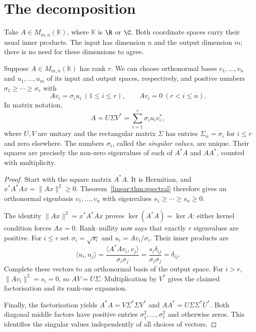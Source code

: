 \section{The decomposition}

Take $A\in M_{m,n}(\mathbb K)$, where $\mathbb K$ is $\R$ or $\C$. Both coordinate spaces carry their usual inner products. The input has dimension $n$ and the output dimension $m$; there is no need for these dimensions to agree.

\begin{theorem}\label{linear:thm:svd}
Suppose $A\in M_{m,n}(\mathbb K)$ has rank $r$. We can choose orthonormal bases $v_1,\ldots,v_n$ and $u_1,\ldots,u_m$ of its input and output spaces, respectively, and positive numbers $\sigma_1\ge\cdots\ge\sigma_r$ with
\[
Av_i=\sigma_iu_i\ (1\le i\le r),\qquad Av_i=0\ (r<i\le n).
\]
In matrix notation,
\[
A=U\Sigma V^*=\sum_{i=1}^r\sigma_iu_iv_i^*,
\]
where $U,V$ are unitary and the rectangular matrix $\Sigma$ has entries $\Sigma_{ii}=\sigma_i$ for $i\le r$ and zero elsewhere. The numbers $\sigma_i$, called the \emph{singular values}, are unique. Their squares are precisely the non-zero eigenvalues of each of $A^*A$ and $AA^*$, counted with multiplicity.
\end{theorem}
\begin{proof}
Start with the square matrix $A^*A$. It is Hermitian, and $x^*A^*Ax=\|Ax\|^2\ge0$. Theorem~\ref{linear:thm:spectral} therefore gives an orthonormal eigenbasis $v_1,\ldots,v_n$ with eigenvalues $s_1\ge\cdots\ge s_n\ge0$.

The identity $\|Ax\|^2=x^*A^*Ax$ proves $\ker(A^*A)=\ker A$: either kernel condition forces $Ax=0$. Rank--nullity now says that exactly $r$ eigenvalues are positive. For $i\le r$ set $\sigma_i=\sqrt{s_i}$ and $u_i=Av_i/\sigma_i$. Their inner products are
\[
\langle u_i,u_j\rangle
=\frac{\langle A^*Av_i,v_j\rangle}{\sigma_i\sigma_j}
=\frac{s_i\delta_{ij}}{\sigma_i\sigma_j}=\delta_{ij}.
\]
Complete these vectors to an orthonormal basis of the output space. For $i>r$, $\|Av_i\|^2=s_i=0$, so $AV=U\Sigma$. Multiplication by $V^*$ gives the claimed factorisation and its rank-one expansion.

Finally, the factorisation yields $A^*A=V\Sigma^*\Sigma V^*$ and $AA^*=U\Sigma\Sigma^*U^*$. Both diagonal middle factors have positive entries $\sigma_1^2,\ldots,\sigma_r^2$ and otherwise zeros. This identifies the singular values independently of all choices of vectors.
\end{proof}

